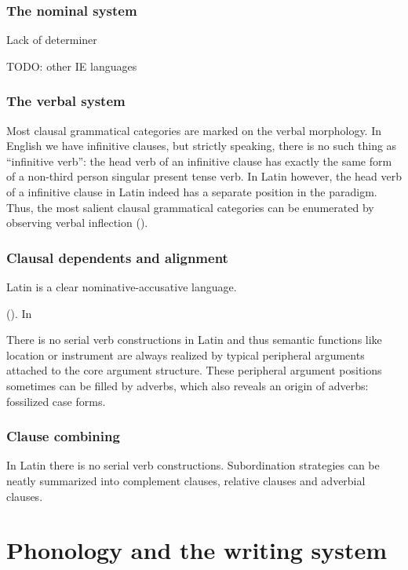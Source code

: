 \documentclass[a4paper, oneside, 12pt]{report}
\begin{document}
\subsection{The nominal system}

Lack of determiner

TODO: other IE languages

\subsection{The verbal system}

Most clausal grammatical categories are marked on the verbal morphology.
In English we have infinitive clauses,
but strictly speaking, there is no such thing as ``infinitive verb'':
the head verb of an infinitive clause 
has exactly the same form of a non-third person singular present tense verb.
In Latin however, the head verb of a infinitive clause in Latin 
indeed has a separate position in the paradigm.
Thus, the most salient clausal grammatical categories can be enumerated  
by observing verbal inflection ().


\subsection{Clausal dependents and alignment}

Latin is a clear nominative-accusative language.

().
In 


There is no serial verb constructions in Latin 
and thus semantic functions like location or instrument 
are always realized by typical peripheral arguments
attached to the core argument structure.
These peripheral argument positions sometimes can be filled by adverbs,
which also reveals an origin of adverbs: fossilized case forms.

\subsection{Clause combining}

In Latin there is no serial verb constructions.
Subordination strategies can be neatly summarized into 
complement clauses, relative clauses and adverbial clauses.


\chapter{Phonology and the writing system}
\end{document}
